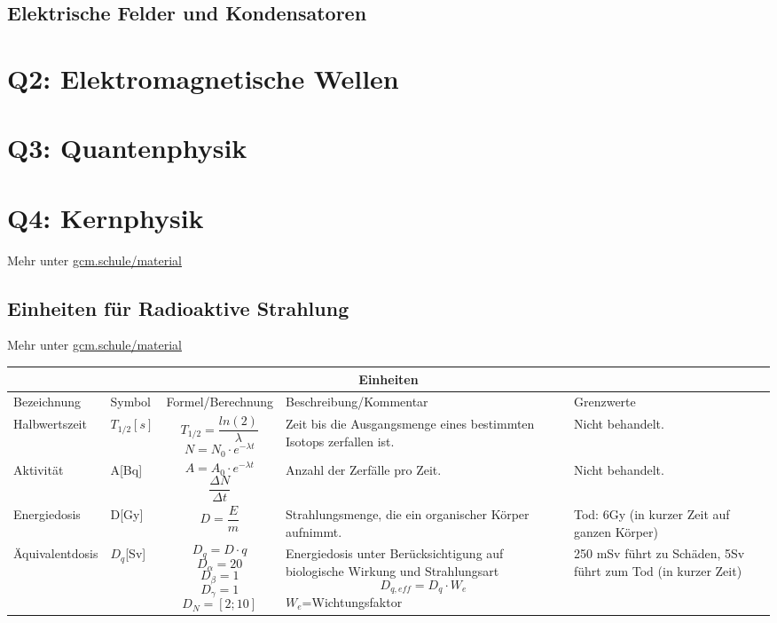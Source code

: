 \documentclass{article}
\begin{document}
        \subsection{Elektrische Felder und Kondensatoren}

    \section{Q2: Elektromagnetische Wellen}

    \section{Q3: Quantenphysik}

    \section{Q4: Kernphysik}

        Mehr unter \href{https://gcm.schule/material/2024/physik/lk13/}{gcm.schule/material}

        \subsection{Einheiten für Radioaktive Strahlung}

        Mehr unter \href{https://gcm.schule/material/2024/physik/lk13/q4_wopla-05.md}{gcm.schule/material}

        \begin{tabular}{ |p{4cm}|p{1cm}|p{3cm}|p{4cm}|p{4cm}|  }
            \hline
            \multicolumn{5}{|c|}{\textbf{Einheiten}} \\
            \hline
            Bezeichnung & Symbol & Formel/Berechnung & Beschreibung/Kommentar & Grenzwerte \\
            \hline
            Halbwertszeit   & $ T_{1/2} [s] $   & \[ T_{1/2}=\frac{ln(2)}{\lambda} \] \[N=N_0 \cdot e^{-\lambda t}\] &   Zeit bis die Ausgangsmenge eines bestimmten Isotops zerfallen ist. & Nicht behandelt. \\
            \hline
            Aktivität & A[Bq] &   \[A=A_0 \cdot e^{-\lambda t}\] \[\frac{\Delta N}{\Delta t}\]  & Anzahl der Zerfälle pro Zeit.   & Nicht behandelt. \\
            \hline
            Energiedosis & D[Gy] & \[D=\frac{E}{m}\] &  Strahlungsmenge, die ein organischer Körper aufnimmt. & Tod: 6Gy (in kurzer Zeit auf ganzen Körper)\\
            \hline
            Äquivalentdosis & $D_q$[Sv]& \[ D_q = D \cdot q \] \[D_{\alpha}=20\] \[D_{\beta}=1\]\[D_{\gamma}=1\] \[D_{N}=[2;10]\] & Energiedosis unter Berücksichtigung auf biologische Wirkung und Strahlungsart \[D_{q,eff}=D_q \cdot W_e\] $W_e$=Wichtungsfaktor & 250 mSv führt zu Schäden, 5Sv führt zum Tod (in kurzer Zeit) \\
            \hline
           \end{tabular}
\end{document}
